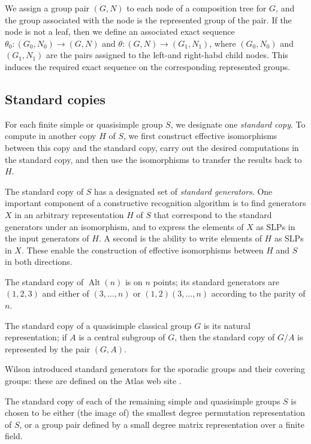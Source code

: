 \documentclass[12pt,twoside,reqno,psamsfonts]{amsproc}
\newcommand{\comment}[1]{\marginpar{\begin{center}\scriptsize{#1}\end{center}}}
\numberwithin{equation}{section}
\numberwithin{figure}{section}
\newcounter{algorithm}
\theoremstyle{plain}
\theoremstyle{definition}
\theoremstyle{remark}
\providecommand{\Alt}[1]{\operatorname{Alt}( #1 )}
\begin{document}
We assign a group pair $(G,N)$ to each node of a composition tree for $G$,
\comment{DFH:added final paragraph}
and the group associated with the node is the represented group of the pair.
If the node is not a leaf, then we define an associated exact sequence
$\theta_0:(G_0,N_0) \rightarrow (G,N)$ and
$\theta:(G,N) \rightarrow (G_1,N_1)$, where  $(G_0,N_0)$ and $(G_1,N_1)$
are the pairs assigned to the left-and right-habd child nodes. This induces
the required exact sequence on the corresponding represented groups.

\subsection{Standard copies}\label{subsection:standard}
For each finite simple or quasisimple group $S$, 
we designate one {\it standard copy}. 
To compute in another copy $H$ of $S$, we first
construct effective isomorphisms between this copy and the
standard copy, carry out the desired computations in the standard
copy, and then use the isomorphisms to transfer the results back to $H$.

The standard copy of $S$ 
has a designated set of {\em standard generators}.
One important component of a constructive recognition algorithm is to find
generators $X$ in an arbitrary representation $H$ of $S$ that correspond to the
standard generators under an isomorphism, and to express the elements of $X$
as SLPs in the input generators of $H$.  
A second is the ability to write elements of $H$ as SLPs in $X$.
These enable the construction of effective isomorphisms
between $H$ and $S$ in both directions.

The standard copy of $\Alt{n}$ is
on $n$ points; its standard generators are $(1,2,3)$ and either of 
$(3,\ldots, n)$ or $(1, 2)(3,\ldots, n)$ according to the parity of $n$.

The standard copy of a quasisimple classical group $G$ is 
its natural representation;  if $A$ is a central subgroup of $G$, then 
the standard copy of $G/A$ is represented by 
the pair $(G,A)$.

Wilson \cite{Wilson96} introduced 
standard generators for the sporadic groups and their covering groups: these  
are defined on the {\sc Atlas} web site \cite{atlas_www}.

The standard copy of each of the remaining simple and quasisimple groups 
$S$ is chosen to be either (the image of) the smallest degree
permutation representation of $S$, or a group pair defined by a small degree
matrix representation over a finite field. 
\end{document}

